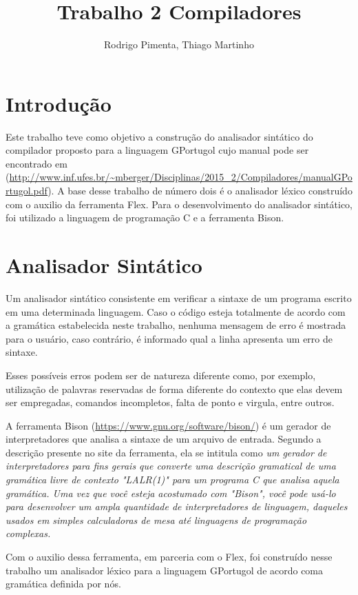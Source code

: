 \documentclass[
12pt,				%
a4paper,			%
english,			%
french,				%
spanish,			%
brazil,				%
article
]{abntex2}
\title{Trabalho 2 Compiladores}
\author{Rodrigo Pimenta, Thiago Martinho}
\begin{document}
\maketitle

\section{Introdução}

Este trabalho teve como objetivo a construção do analisador sintático do  compilador proposto para a linguagem GPortugol cujo manual pode ser encontrado em (\url{http://www.inf.ufes.br/~mberger/Disciplinas/2015_2/Compiladores/manualGPortugol.pdf}). A base desse trabalho de número dois é o analisador léxico construído com o auxilio da ferramenta Flex.
Para o desenvolvimento do analisador sintático, foi utilizado a linguagem de programação C e a ferramenta Bison.


\section{Analisador Sintático}

Um analisador sintático consistente em verificar a sintaxe de um programa escrito em uma determinada linguagem. Caso o código esteja totalmente de acordo com a gramática estabelecida neste trabalho, nenhuma mensagem de erro é mostrada para o usuário, caso contrário, é informado qual a linha apresenta um erro de sintaxe.

Esses possíveis erros podem ser de natureza diferente como, por exemplo, utilização de palavras reservadas de forma diferente do contexto que elas devem ser empregadas, comandos incompletos, falta de ponto e virgula, entre outros. 

A ferramenta Bison (\url{https://www.gnu.org/software/bison/}) é um gerador de interpretadores que analisa a sintaxe de um arquivo de entrada. Segundo a descrição presente no site da ferramenta, ela se intitula como \textit{um gerador de interpretadores para fins gerais que converte uma descrição gramatical de uma gramática livre de contexto "LALR(1)" para um programa C que analisa aquela gramática. Uma vez que você esteja acostumado com "Bison", você pode usá-lo para desenvolver um ampla quantidade de interpretadores de linguagem, daqueles usados em simples calculadoras de mesa até linguagens de programação complexas.}

Com o auxilio dessa ferramenta, em parceria com o Flex, foi construído nesse trabalho um analisador léxico para a linguagem GPortugol de acordo coma  gramática definida por nós.
\end{document}
